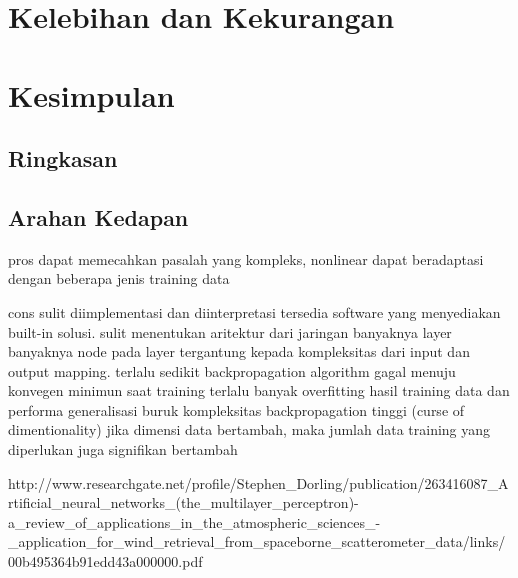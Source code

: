 \section{Kelebihan dan Kekurangan}
\lipsum

\section{Kesimpulan}

	\subsection{Ringkasan}
	\lipsum[1]

	\subsection{Arahan Kedapan}
	\lipsum[1]


pros 
	dapat memecahkan pasalah yang kompleks, nonlinear
	dapat beradaptasi dengan beberapa jenis training data

cons 
sulit diimplementasi dan diinterpretasi
	tersedia software yang menyediakan built-in solusi.
sulit menentukan aritektur dari jaringan
	banyaknya layer
	banyaknya node pada layer
		tergantung kepada kompleksitas dari input dan output mapping. 
		terlalu sedikit backpropagation algorithm gagal menuju konvegen minimun saat training 
		terlalu banyak overfitting hasil training data dan performa generalisasi buruk
kompleksitas backpropagation tinggi (curse of dimentionality)
	jika dimensi data bertambah, maka jumlah data training yang diperlukan juga signifikan bertambah


	http://www.researchgate.net/profile/Stephen_Dorling/publication/263416087_Artificial_neural_networks_(the_multilayer_perceptron)-a_review_of_applications_in_the_atmospheric_sciences_-_application_for_wind_retrieval_from_spaceborne_scatterometer_data/links/00b495364b91edd43a000000.pdf